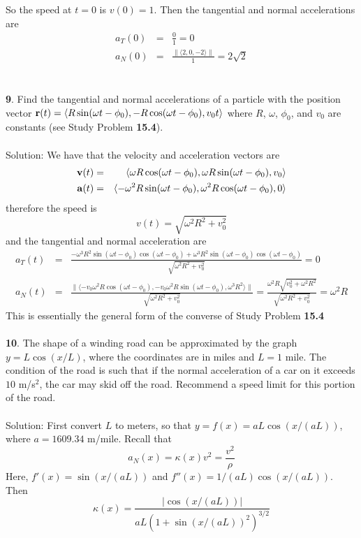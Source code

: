 \documentclass[12pt]{amsbook}
\newcommand{\la}{\langle}
\newcommand{\ra}{\rangle}
\begin{document}
So the speed at $t=0$ is $v(0)=1$. Then the tangential and normal accelerations are
\begin{eqnarray*}
a_T(0)&=&\frac{0}{1}=0 \\
a_N(0)&=&\frac{\|\la 2,0,-2 \ra\|}{1}=2\sqrt{2}
\end{eqnarray*}
\\
\\
{\small\bf 9}. Find the tangential and normal accelerations of a particle with the position
vector ${\bf r}(t)=\la R\sin(\omega t-\phi_0),-R\cos(\omega t-\phi_0),v_0 t\ra$ where $R$, $\omega$, $\phi_0$, and $v_0$ are constants (see Study Problem {\bf 15.4}).
\\
\\
{\sc Solution}: We have that the velocity and acceleration vectors are
\begin{eqnarray*}
{\bf v}(t)&=&\la \omega R \cos(\omega t-\phi_0), \omega R \sin(\omega t-\phi_0), v_0 \ra \\
{\bf a}(t)&=&\la -\omega^2 R \sin(\omega t-\phi_0), \omega^2 R \cos(\omega t-\phi_0), 0 \ra
\end{eqnarray*}
therefore the speed is
$$v(t)=\sqrt{\omega^2R^2+v_0^2}$$
and the tangential and normal acceleration are 
\begin{eqnarray*}
a_T(t)&=&\frac{-\omega^3R^2\sin(\omega t-\phi_0)\cos(\omega t-\phi_0)+\omega^3R^2\sin(\omega t-\phi_0)\cos(\omega t-\phi_0)}{\sqrt{\omega^2R^2+v_0^2}}=0 \\
a_N(t)&=&\frac{\|\la-v_0\omega^2R\cos(\omega t-\phi_0),-v_0\omega^2R\sin(\omega t-\phi_0),\omega^3R^2  \ra\|}{\sqrt{\omega^2R^2+v_0^2}}=\frac{\omega^2R\sqrt{v_0^2+\omega^2R^2}}{\sqrt{\omega^2R^2+v_0^2}}=\omega^2R
\end{eqnarray*}
This is essentially the general form of the converse of Study Problem {\bf 15.4}
\\
\\
{\small\bf 10}. The shape of a winding road can be approximated by the graph $y=L\cos(x/L)$, where the coordinates are in miles and $L = 1$ mile. The condition of the road is such that if the normal acceleration of a car on it exceeds $10$ m/s$^2$, the car may skid off the road. Recommend a speed limit for this portion of the road.
\\
\\
{\sc Solution}: First convert $L$ to meters, so that $y=f(x)=aL\cos(x/(aL))$, where $a=1609.34$ m/mile. Recall that
$$a_N(x)=\kappa(x)v^2=\frac{v^2}{\rho}$$
Here, $f'(x)=\sin(x/(aL))$ and $f''(x)=1/(aL)\cos(x/(aL))$. Then 
$$\kappa(x)=\frac{|\cos(x/(aL))|}{aL(1+\sin(x/(aL))^2)^{3/2}}$$
\end{document}
